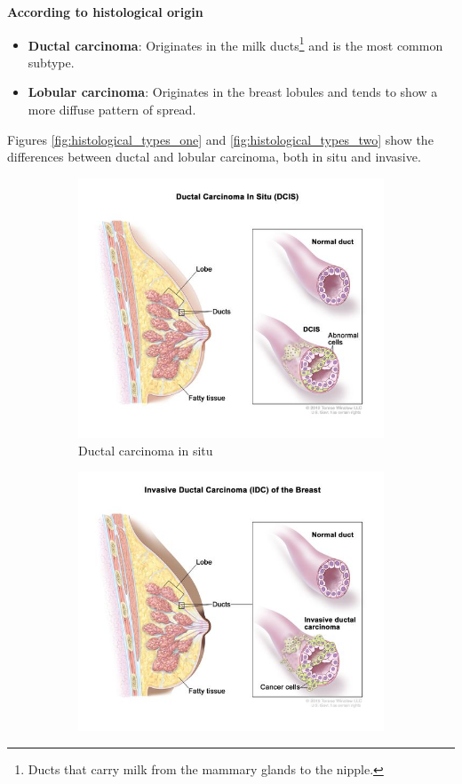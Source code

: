 \documentclass[a4paper,10pt]{book}
\begin{document}
\textbf{According to histological origin}
\begin{itemize}
	\item \textbf{Ductal carcinoma}: Originates in the milk ducts\footnote{Ducts that carry milk from the mammary glands to the nipple.} and is the most common subtype.
	\item \textbf{Lobular carcinoma}: Originates in the breast lobules and tends to show a more diffuse pattern of spread.
\end{itemize}

Figures \ref{fig:histological_types_one} and \ref{fig:histological_types_two} show the differences between ductal and lobular carcinoma, both in situ and invasive.

\begin{figure}[h!]
	\centering
	\begin{subfigure}[c]{0.48\textwidth}
		\centering
		\includegraphics[width=\textwidth]{reports/assets/dcis.jpg}
		\caption{Ductal carcinoma in situ}
		\label{fig:dcis}
	\end{subfigure}
	\begin{subfigure}[c]{0.48\textwidth}
		\centering
		\includegraphics[width=\textwidth]{reports/assets/idc.jpg}

\end{subfigure}
\end{figure}
\end{document}
